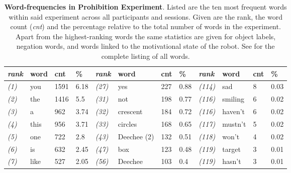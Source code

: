 \begin{screenonly}
\begin{table*}[h]
\caption{\textbf{Word-frequencies in Prohibition Experiment}. Listed are the ten most frequent words
    within said experiment across all participants and sessions. Given are the rank, the word count (\emph{cnt}) and the
    percentage relative to the total number of words in the experiment. Apart from the highest-ranking words the same
    statistics are given for object labels, negation words, and words linked to the motivational state of the robot.
    See \cite{Foerster2013} for the complete listing of all words.}
  \label{tbl_wf_p}
  \begin{tabular*}{\hsize}{@{\extracolsep{\fill}}llllllllllll}
    \textsl{rank} & word & cnt & \% & \hspace*{2ex}\textsl{rank} & word & cnt & \% & \hspace*{2ex}\textsl{rank} & word & cnt & \%\\
    \toprule
    \textsl{(1)} & you & 1591 & 6.18 & \hspace*{2ex}\textsl{(27)} & yes & 227 & 0.88 & \hspace*{2ex}\textsl{(114)} & sad & 8 & 0.03\\
    \textsl{(2)} & the & 1416 & 5.5 & \hspace*{2ex}\textsl{(31)} & not & 198 & 0.77 & \hspace*{2ex}\textsl{(116)} & smiling & 6 & 0.02\\
    \textsl{(3)} & a & 962 & 3.74 & \hspace*{2ex}\textsl{(32)} & crescent & 184 & 0.72 & \hspace*{2ex}\textsl{(116)} & haven't & 6 & 0.02\\
    \textsl{(4)} & this & 956 & 3.71 & \hspace*{2ex}\textsl{(33)} & circles & 168 & 0.65 & \hspace*{2ex}\textsl{(117)} & mustn't & 5 & 0.02\\
    \textsl{(5)} & one & 722 & 2.8 & \hspace*{2ex}\textsl{(43)} & Deechee (2) & 132 & 0.51 & \hspace*{2ex}\textsl{(118)} & won't & 4 & 0.02\\
    \textsl{(6)} & is & 632 & 2.45 & \hspace*{2ex}\textsl{(47)} & box & 123 & 0.48 & \hspace*{2ex}\textsl{(119)} & target & 3 & 0.01\\
    \textsl{(7)} & like & 527 & 2.05 & \hspace*{2ex}\textsl{(56)} & Deechee & 103 & 0.4 & \hspace*{2ex}\textsl{(119)} & hasn't & 3 & 0.01\\

\end{tabular*}
\end{table*}
\end{screenonly}
